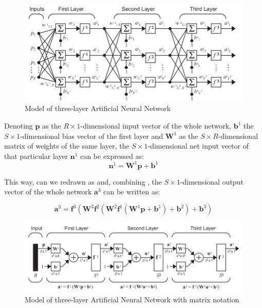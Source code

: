 \begin{figure}[!ht]
\centering
\includegraphics[width=\textwidth]{images/neuralnetworkmodel.png}
\caption{Model of three-layer Artificial Neural Network}
\label{fig:neuralnetworkmodel}
\end{figure}

Denoting $\mathbf{p}$ as the $R\times 1$-dimensional input vector of
the whole network, $\mathbf{b}^1$ the $S\times 1$-dimensional bias
vector of the first layer and $\mathbf{W}^1$ as the $S\times
R$-dimensional matrix of weights of the same layer, the $S\times
1$-dimensional net input vector of that particular layer
$\mathbf{n}^1$ can be expressed as:
\begin{equation} 
\mathbf{n}^1=\mathbf{W}^1\mathbf{p}+\mathbf{b}^1
\label{eq:netinputvector}
\end{equation}

This way,  can we redrawn
as  and,
combining , the
$S\times 1$-dimensional output vector of the whole network
$\mathbf{a}^3$ can be written as:

\begin{equation}
\mathbf{a}^3=\mathbf{f}^3(\mathbf{W}^3\mathbf{f}^2(\mathbf{W}^2\mathbf{f}^1(\mathbf{W}^1\mathbf{p}+\mathbf{b}^1)+\mathbf{b}^2)+\mathbf{b}^3)
\label{eq:ouputnetworkvector}
\end{equation}

\begin{figure}[!ht]
\centering
\includegraphics[width=\textwidth]{images/neuralnetworkmodelVectorial.png}
\caption{Model of three-layer Artificial Neural Network with matrix notation}
\label{fig:neuralnetworkmodelVectorial}
\end{figure}

